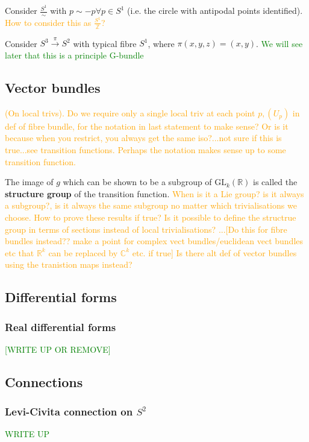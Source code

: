 \documentclass[a4paper]{article}
\theoremstyle{definition} \newtheorem*{definition}{Definition}
\theoremstyle{definition} \newtheorem*{definitions}{Definitions}
\theoremstyle{plain} \newtheorem{theorem}{Theorem}[section]
\theoremstyle{plain} \newtheorem{proposition}[theorem]{Proposition}
\theoremstyle{plain} \newtheorem{corollary}[theorem]{Corollary}
\theoremstyle{plain} \newtheorem{lemma}[theorem]{Lemma}
\theoremstyle{plain} \newtheorem{example}[theorem]{Example}
\newcommand{\question}[1]{\textcolor{orange}{#1}}
\newcommand{\finish}[1]{\textcolor{green}{#1}}
\newcommand{\defn}[1]{\textbf{#1}}
\newcommand{\realnos}{\mathbb{R}}
\newcommand{\complexnos}{\mathbb{C}}
\begin{document}
Consider $\frac{S^1}{\sim}$ with $p\sim -p \forall p\in S^1$ (i.e. the circle with antipodal points identified). \question{How to consider this as $\frac{S^1}{\mathbb{Z}}$?}


Consider $S^3\xrightarrow{\pi} S^2$ with typical fibre $S^1$, where $\pi(x, y, z)=(x, y)$. \finish{We will see later that this is a principle G-bundle}

\subsection{Vector bundles}
\question{(On local trivs). Do we require only a single local triv at each point $p, (U_p)$ in def of fibre bundle, for the notation in last statement to make sense? Or is it because when you restrict, you always get the same iso?...not sure if this is true...see transition functions. Perhaps the notation makes sense up to some transition function.}

The image of $g$ which can be shown to be a subgroup of $\mathrm{GL}_k(\realnos)$ is called the \defn{structure group} of the transition function. \question{When is it a Lie group? is it always a subgroup?, is it always the same subgroup no matter which trivialisations we choose. How to prove these results if true?} \question{Is it possible to define the structrue group in terms of sections instead of local trivialisations?}
\question{...[Do this for fibre bundles instead?? make a point for complex vect bundles/euclidean vect bundles etc that $\realnos^k$ can be replaced by $\complexnos^k$ etc. if true]}
\question{Is there alt def of vector bundles using the tranistion maps instead?}

\subsection{Differential forms}

\subsubsection{Real differential forms}
\finish{[WRITE UP OR REMOVE]}

\subsection{Connections}

\subsubsection{Levi-Civita connection on $S^2$}
\finish{WRITE UP}
\end{document}
